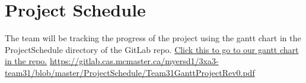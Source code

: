 \documentclass{article}
\begin{document}
\section{Project Schedule}
The team will be tracking the progress of the project using the gantt chart in the ProjectSchedule directory of the GitLab repo.
\newline
\href{https://gitlab.cas.mcmaster.ca/myersd1/3xa3-team31/blob/master/ProjectSchedule/Team31GanttProjectRev0.pdf}{Click this to go to our gantt chart in the repo.}
\newline
\url{https://gitlab.cas.mcmaster.ca/myersd1/3xa3-team31/blob/master/ProjectSchedule/Team31GanttProjectRev0.pdf}

\end{document}
